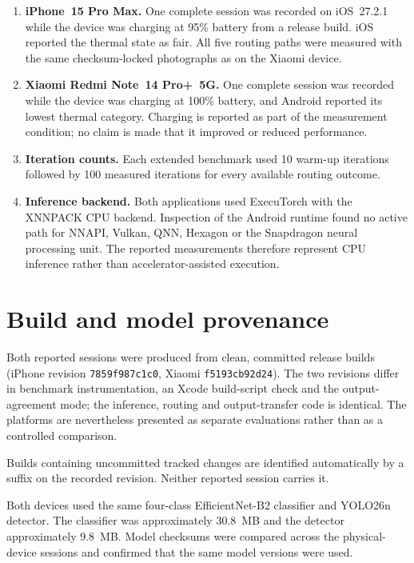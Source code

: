 \documentclass[preprint,12pt,authoryear]{elsarticle}
\begin{document}
\begin{enumerate}
  \item \textbf{iPhone~15 Pro Max.} One complete session was recorded on
  iOS~27.2.1 while the device was charging at 95\% battery from a release build. iOS reported the
  thermal state as fair. All five routing paths were measured with the same
  checksum-locked photographs as on the Xiaomi device.

  \item \textbf{Xiaomi Redmi Note~14 Pro+~5G.} One complete session was
  recorded while the device was charging at 100\% battery, and Android
  reported its lowest thermal category. Charging is
  reported as part of the measurement condition; no claim is made that it
  improved or reduced performance.

  \item \textbf{Iteration counts.} Each extended benchmark used 10 warm-up
  iterations followed by 100 measured iterations for every available routing
  outcome.

  \item \textbf{Inference backend.} Both applications used ExecuTorch with
  the XNNPACK CPU backend. Inspection of the Android runtime found no active
  path for NNAPI, Vulkan, QNN, Hexagon or the Snapdragon neural processing
  unit. The reported measurements therefore represent CPU inference rather
  than accelerator-assisted execution.
\end{enumerate}

\section{Build and model provenance}
\label{sup:provenance}

Both reported sessions were produced from clean, committed release builds
(iPhone revision \texttt{7859f987c1c0}, Xiaomi \texttt{f5193cb92d24}). The two
revisions differ in benchmark instrumentation, an Xcode build-script check and
the output-agreement mode; the inference, routing and output-transfer code is
identical. The platforms are
nevertheless presented as separate evaluations rather than as a controlled
comparison.

Builds containing uncommitted tracked changes are identified automatically by
a suffix on the recorded revision. Neither reported session carries it.

Both devices used the same four-class EfficientNet-B2 classifier and YOLO26n
detector. The classifier was approximately 30.8~MB and the detector
approximately 9.8~MB. Model checksums were compared across the
physical-device sessions and confirmed that the same model versions were used.
\end{document}
